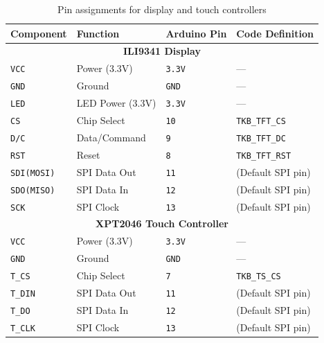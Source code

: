 \begin{table}[ht!]
\centering
\caption{Pin assignments for display and touch controllers}
\begin{tabular}{|l|l|l|l|}
\hline
\textbf{Component} & \textbf{Function} & \textbf{Arduino Pin} & \textbf{Code Definition} \\
\hline
\multicolumn{4}{|c|}{\textbf{ILI9341 Display}} \\
\hline
\verb|VCC| & Power (3.3V) & \verb|3.3V| & — \\
\verb|GND| & Ground & \verb|GND| & — \\
\verb|LED| & LED Power (3.3V) & \verb|3.3V| & — \\
\verb|CS| & Chip Select & \verb|10| & \verb|TKB_TFT_CS| \\
\verb|D/C| & Data/Command & \verb|9| & \verb|TKB_TFT_DC| \\
\verb|RST| & Reset & \verb|8| & \verb|TKB_TFT_RST| \\
\verb|SDI(MOSI)| & SPI Data Out & \verb|11| & (Default SPI pin) \\
\verb|SDO(MISO)| & SPI Data In & \verb|12| & (Default SPI pin) \\
\verb|SCK| & SPI Clock & \verb|13| & (Default SPI pin) \\
\hline
\multicolumn{4}{|c|}{\textbf{XPT2046 Touch Controller}} \\
\hline
\verb|VCC| & Power (3.3V) & \verb|3.3V| & — \\
\verb|GND| & Ground & \verb|GND| & — \\
\verb|T_CS| & Chip Select & \verb|7| & \verb|TKB_TS_CS| \\
\verb|T_DIN| & SPI Data Out & \verb|11| & (Default SPI pin) \\
\verb|T_DO| & SPI Data In & \verb|12| & (Default SPI pin) \\
\verb|T_CLK| & SPI Clock & \verb|13| & (Default SPI pin) \\
\hline
\end{tabular}
\label{table:touchscreen-pins}
\end{table}

